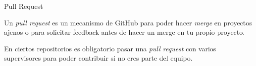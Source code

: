 \documentclass{beamer}
\begin{document}
\begin{frame}{Pull Request}

    Un \textit{pull request} es un mecanismo de GitHub para poder hacer \textit{merge} en proyectos ajenos o para solicitar feedback antes de hacer un merge en tu propio proyecto.

    En ciertos repositorios es obligatorio pasar una \textit{pull request} con varios supervisores para poder contribuir si no eres parte del equipo.

\end{frame}
\end{document}
